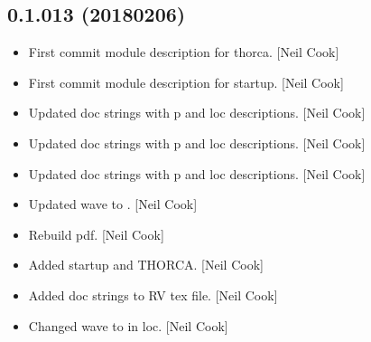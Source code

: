 \documentclass[a4paper,10pt,english]{report}
\begin{document}
\subsection{0.1.013 (2018\sphinxhyphen{}02\sphinxhyphen{}06)}
\label{\detokenize{misc/changelog:id510}}\begin{itemize}
\item {} 
First commit module description for thorca. {[}Neil Cook{]}

\item {} 
First commit module description for startup. {[}Neil Cook{]}

\item {} 
Updated doc strings with p and loc descriptions. {[}Neil Cook{]}

\item {} 
Updated doc strings with p and loc descriptions. {[}Neil Cook{]}

\item {} 
Updated doc strings with p and loc descriptions. {[}Neil Cook{]}

\item {} 
Updated wave to . {[}Neil Cook{]}

\item {} 
Rebuild pdf. {[}Neil Cook{]}

\item {} 
Added startup and THORCA. {[}Neil Cook{]}

\item {} 
Added doc strings to RV tex file. {[}Neil Cook{]}

\item {} 
Changed wave to  in loc. {[}Neil Cook{]}

\end{itemize}
\end{document}
